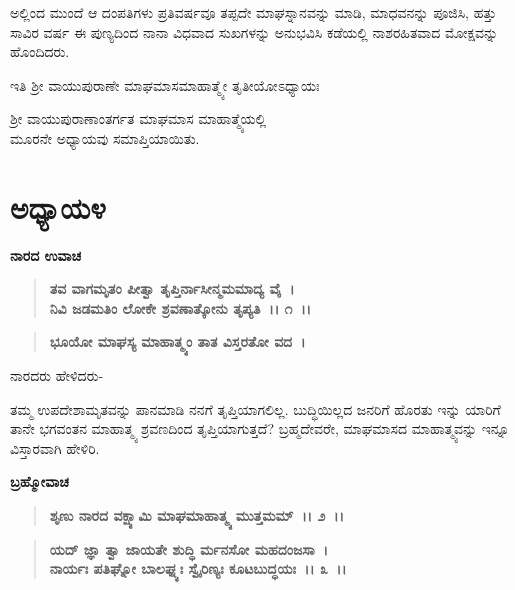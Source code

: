 ಅಲ್ಲಿಂದ ಮುಂದೆ ಆ ದಂಪತಿಗಳು ಪ್ರತಿವರ್ಷವೂ ತಪ್ಪದೇ ಮಾಘಸ್ನಾನವನ್ನು ಮಾಡಿ, ಮಾಧವನನ್ನು ಪೂಜಿಸಿ, ಹತ್ತು ಸಾವಿರ ವರ್ಷ ಈ ಪುಣ್ಯದಿಂದ ನಾನಾ ವಿಧವಾದ ಸುಖಗಳನ್ನು ಅನುಭವಿಸಿ ಕಡೆಯಲ್ಲಿ ನಾಶರಹಿತವಾದ ಮೋಕ್ಷವನ್ನು ಹೊಂದಿದರು.

\begin{center}
ಇತಿ ಶ‍್ರೀ ವಾಯುಪುರಾಣೇ ಮಾಘಮಾಸಮಾಹಾತ್ಮ್ಯೇ ತೃತೀಯೋಽಧ್ಯಾಯಃ
\end{center}

\begin{center}
ಶ‍್ರೀ ವಾಯುಪುರಾಣಾಂತರ್ಗತ ಮಾಘಮಾಸ ಮಾಹಾತ್ಮ್ಯೆಯಲ್ಲಿ \\ ಮೂರನೇ ಅಧ್ಯಾಯವು ಸಮಾಪ್ತಿಯಾಯಿತು.
\end{center}

\newpage

\section*{ಅಧ್ಯಾಯ\enginline{-}೪}

\emptypage

\begin{flushleft}
\textbf{ನಾರದ ಉವಾಚ\enginline{-}}
\end{flushleft}

\begin{verse}
\textbf{ತವ ವಾಗಮೃತಂ ಪೀತ್ವಾ ತೃಪ್ತಿರ್ನಾಸೀನ್ಮಮಮಾದ್ಯ ವೈ~।}\\\textbf{ನಿವಿ ಜಡಮತಿಂ ಲೋಕೇ ಶ್ರವಣಾತ್ಕೋನು ತೃಪ್ಯತಿ~।। ೧~।।}
\end{verse}

\begin{verse}
\textbf{ಭೂಯೋ ಮಾಘಸ್ಯ ಮಾಹಾತ್ಮ್ಯಂ ತಾತ ವಿಸ್ತರತೋ ವದ~।}
\end{verse}

\begin{flushleft}
ನಾರದರು ಹೇಳಿದರು-
\end{flushleft}

ತಮ್ಮ ಉಪದೇಶಾಮೃತವನ್ನು ಪಾನಮಾಡಿ ನನಗೆ ತೃಪ್ತಿಯಾಗಲಿಲ್ಲ. ಬುದ್ಧಿಯಿಲ್ಲದ ಜನರಿಗೆ ಹೊರತು ಇನ್ನು ಯಾರಿಗೆ ತಾನೇ ಭಗವಂತನ ಮಾಹಾತ್ಮ್ಯ ಶ್ರವಣದಿಂದ ತೃಪ್ತಿಯಾಗುತ್ತದೆ? ಬ್ರಹ್ಮದೇವರೇ, ಮಾಘಮಾಸದ ಮಾಹಾತ್ಮ್ಯವನ್ನು ಇನ್ನೂ ವಿಸ್ತಾರವಾಗಿ ಹೇಳಿರಿ.

\begin{flushleft}
\textbf{ಬ್ರಹ್ಮೋವಾಚ\enginline{-}}
\end{flushleft}

\begin{verse}
\textbf{ಶೃಣು ನಾರದ ವಕ್ಷ್ಯಾಮಿ ಮಾಘಮಾಹಾತ್ಮ್ಯ ಮುತ್ತಮಮ್~।। ೨~।। }
\end{verse}

\begin{verse}
\textbf{ಯದ್ ಜ್ಞಾ ತ್ವಾ ಜಾಯತೇ ಶುದ್ಧಿ ರ್ಮನಸೋ ಮಹದಂಜಸಾ~।}\\\textbf{ನಾರ್ಯಃ ಪತಿಘ್ನೋ ಬಾಲಘ್ನ್ಯಃ ಸ್ವೈರಿಣ್ಯಃ ಕೂಟಬುದ್ಧಯಃ~।। ೩~।। }
\end{verse}

